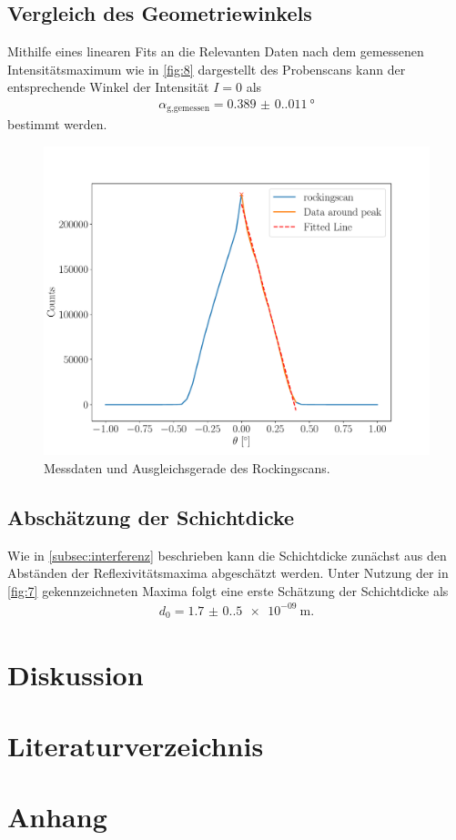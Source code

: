 \documentclass[12pt]{article}
\begin{document}
\subsection{Vergleich des Geometriewinkels}
Mithilfe eines linearen Fits an die Relevanten Daten nach dem gemessenen Intensitätsmaximum wie in \autoref{fig:8} dargestellt des Probenscans kann der entsprechende Winkel der Intensität $I=0$ als
\begin{align*}
  \alpha_\text{g,gemessen}=\SI{0.389(0.011)}{\degree}
\end{align*}
bestimmt werden. 
\begin{figure}[H]
  \centering
  \includegraphics[scale=0.6]{Ressourcen/rocking.pdf}
  \caption{Messdaten und Ausgleichsgerade des Rockingscans.}\label{fig:8}
\end{figure}
\subsection{Abschätzung der Schichtdicke}
Wie in \autoref{subsec:interferenz} beschrieben kann die Schichtdicke zunächst aus den Abständen der Reflexivitätsmaxima abgeschätzt werden.
Unter Nutzung der in \autoref{fig:7} gekennzeichneten Maxima folgt eine erste Schätzung der Schichtdicke als
\begin{align*}
  d_\text{0} = \SI{1.7(0.5)e-09}{\meter}\text{.}
\end{align*}

\section{Diskussion}\label{sec:diskussion}

\section{Literaturverzeichnis}\label{sec:literaturverzeichnis}
\printbibliography[heading = none]
\newpage

\section{Anhang}\label{sec:anhang}
\end{document}
